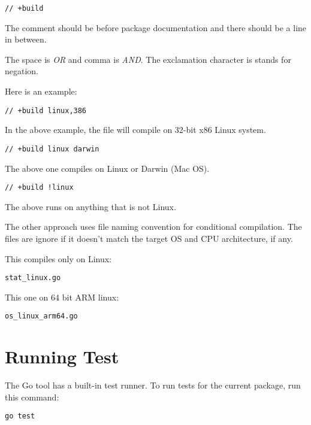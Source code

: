\begin{lstlisting}[numbers=none]
// +build
\end{lstlisting}

The comment should be before package documentation and there should be
a line in between.

The space is \textit{OR} and comma is \textit{AND}.  The exclamation
character is stands for negation.

Here is an example:

\begin{lstlisting}[numbers=none]
// +build linux,386
\end{lstlisting}

In the above example, the file will compile on 32-bit x86 Linux
system.

\begin{lstlisting}[numbers=none]
// +build linux darwin
\end{lstlisting}

The above one compiles on Linux or Darwin (Mac OS).

\begin{lstlisting}[numbers=none]
// +build !linux
\end{lstlisting}

The above runs on anything that is not Linux.

The other approach uses file naming convention for conditional
compilation.  The files are ignore if it doesn't match the target OS
and CPU architecture, if any.

This compiles only on Linux:

\begin{lstlisting}[numbers=none]
stat_linux.go
\end{lstlisting}

This one on 64 bit ARM linux:

\begin{lstlisting}[numbers=none]
os_linux_arm64.go
\end{lstlisting}

\section{Running Test}

The Go tool has a built-in test runner.  To run tests
for the current package, run this command:

\begin{lstlisting}[numbers=none]
go test
\end{lstlisting}

